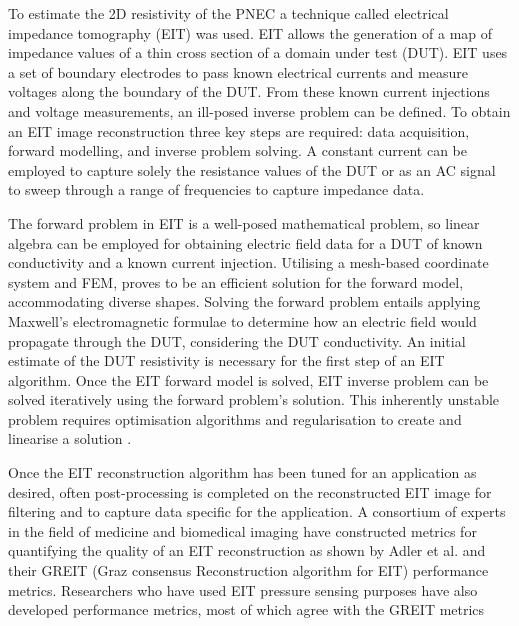 To estimate the 2D resistivity of the PNEC a technique called electrical impedance tomography (EIT) was used. EIT allows the generation of a map of impedance values of a thin cross section of a domain under test (DUT). EIT uses a set of boundary electrodes to pass known electrical currents and measure voltages along the boundary of the DUT. From these known current injections and voltage measurements, an ill-posed inverse problem can be defined. To obtain an EIT image reconstruction three key steps are required: data acquisition, forward modelling, and inverse problem solving. A constant current can be employed to capture solely the resistance values of the DUT or as an AC signal to sweep through a range of frequencies to capture impedance data. 


The forward problem in EIT is a well-posed mathematical problem, so linear algebra can be employed for obtaining electric field data for a DUT of known conductivity and a known current injection. Utilising a mesh-based coordinate system and FEM, proves to be an efficient solution for the forward model, accommodating diverse shapes. Solving the forward problem entails applying Maxwell's electromagnetic formulae to determine how an electric field would propagate through the DUT, considering the DUT conductivity. An initial estimate of the DUT resistivity is necessary for the first step of an EIT algorithm. Once the EIT forward model is solved, EIT inverse problem can be solved iteratively using the forward problem's solution. This inherently unstable problem requires optimisation algorithms and regularisation to create and linearise a solution \citep{Bayford2018,Lionheart2003,Martins2019,Adler2021}.

Once the EIT reconstruction algorithm has been tuned for an application as desired, often post-processing is completed on the reconstructed EIT image for filtering and to capture data specific for the application. A consortium of experts in the field of medicine and biomedical imaging  have constructed metrics for quantifying the quality of an EIT reconstruction as shown by Adler et al. \citep{Adler2009} and their GREIT (Graz consensus Reconstruction algorithm for EIT) performance metrics. Researchers who have used EIT pressure sensing purposes have also developed performance metrics, most of which agree with the GREIT metrics \citep{Wang2020,Silvera-Tawil2015,Visentin2016,Tallman2020,Sun2020,Hassan2009,Kato2007}

